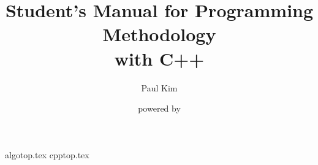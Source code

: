 \documentclass[10pt,openany,a4pper]{book}
\begin{document}
\begin{titlepage}
    \title{Student's Manual for Programming Methodology\\{\Large with C++}}
    \author{Paul Kim}
    \date{powered by \LaTeXe{}}
\maketitle
\end{titlepage}
\tableofcontents
\newpage

{algotop.tex}
{cpptop.tex}
\end{document}
